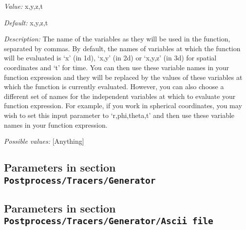 \begin{itemize}
{\it Value:} x,y,z,t


{\it Default:} x,y,z,t


{\it Description:} The name of the variables as they will be used in the function, separated by commas. By default, the names of variables at which the function will be evaluated is `x' (in 1d), `x,y' (in 2d) or `x,y,z' (in 3d) for spatial coordinates and `t' for time. You can then use these variable names in your function expression and they will be replaced by the values of these variables at which the function is currently evaluated. However, you can also choose a different set of names for the independent variables at which to evaluate your function expression. For example, if you work in spherical coordinates, you may wish to set this input parameter to `r,phi,theta,t' and then use these variable names in your function expression.


{\it Possible values:} [Anything]
\end{itemize}

\subsection{Parameters in section \tt Postprocess/Tracers/Generator}
\label{parameters:Postprocess/Tracers/Generator}


\subsection{Parameters in section \tt Postprocess/Tracers/Generator/Ascii file}
\label{parameters:Postprocess/Tracers/Generator/Ascii_20file}

